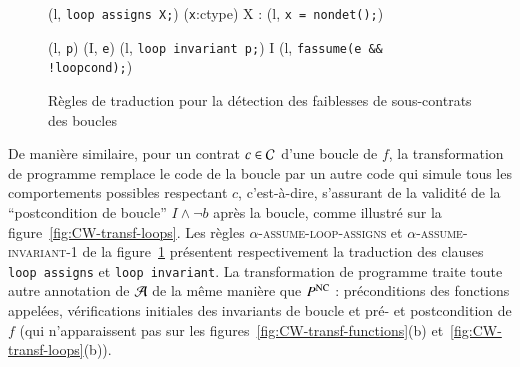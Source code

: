 \begin{figure}[tb]
  \scriptsize{
    {
      {}
      {(l, \mbox{\lstinline'loop assigns X;'})
        \forall (\mbox{\lstinline'x'}:ctype) \in X :
        (l, \mbox{\lstinline'x = nondet();'})}{}
    }

    {
      {(l, \mbox{\lstinline'p'})  (I, \mbox{\lstinline'e'})}
      {
        (l, \mbox{\lstinline'loop invariant p;'}) 
        I \concat (l, \mbox{\lstinline'fassume(e && !loopcond);'})
      }{}
    }

  }
  \caption{Règles de traduction pour la détection des faiblesses de
    sous-contrats des boucles}
  \label{fig:assume-loop-annot}
\end{figure}

De manière similaire, pour un contrat $c\in{\ensuremath\mathcal{C}}$ d'une boucle de $f$, la
transformation de programme remplace le code de la boucle par un autre code qui
simule tous les comportements possibles respectant $c$, c'est-à-dire, s'assurant
de la validité de la ``postcondition de boucle'' $I\wedge \neg b$ après la
boucle, comme illustré sur la figure~\ref{fig:CW-transf-loops}.
Les règles \textsc{$\alpha$-assume-loop-assigns} et
\textsc{$\alpha$-assume-invariant-1} de la figure~\ref{fig:assume-loop-annot}
présentent respectivement la traduction des clauses \lstinline'loop assigns' et
\lstinline'loop invariant'.
La transformation de programme traite toute autre annotation de ${\mathcal{A}}$ de la
même manière que $P^{\mathrm{NC}}$ : préconditions des fonctions appelées, vérifications
initiales des invariants de boucle et pré- et postcondition de $f$ (qui
n'apparaissent pas sur les figures~\ref{fig:CW-transf-functions}(b)
et~\ref{fig:CW-transf-loops}(b)).


